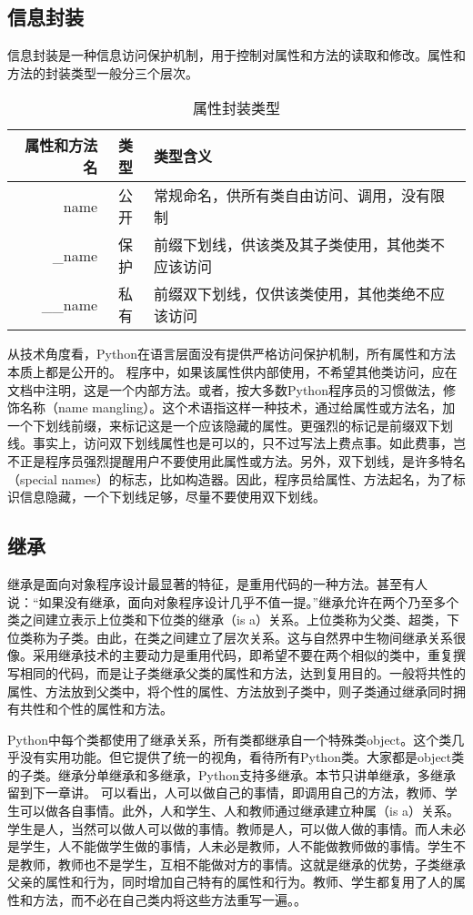 \subsection{信息封装}
信息封装是一种信息访问保护机制，用于控制对属性和方法的读取和修改。属性和方法的封装类型一般分三个层次。
\begin{table}
  \centering
  \begin{tabular}{rcl}
    \toprule
    属性和方法名 & 类型 & 类型含义 \\
    \midrule
    name        & 公开  & 常规命名，供所有类自由访问、调用，没有限制 \\
    \_name      & 保护  & 前缀下划线，供该类及其子类使用，其他类不应该访问 \\
    \_\_name    & 私有  & 前缀双下划线，仅供该类使用，其他类绝不应该访问 \\
    \bottomrule
  \end{tabular}
  \caption{属性封装类型}
\end{table}
从技术角度看，Python在语言层面没有提供严格访问保护机制，所有属性和方法本质上都是公开的。 程序中，如果该属性供内部使用，不希望其他类访问，应在文档中注明，这是一个内部方法。或者，按大多数Python程序员的习惯做法，修饰名称（name mangling）。这个术语指这样一种技术，通过给属性或方法名，加一个下划线前缀，来标记这是一个应该隐藏的属性。更强烈的标记是前缀双下划线。事实上，访问双下划线属性也是可以的，只不过写法上费点事。如此费事，岂不正是程序员强烈提醒用户不要使用此属性或方法。另外，双下划线，是许多特名（special names）的标志，比如构造器。因此，程序员给属性、方法起名，为了标识信息隐藏，一个下划线足够，尽量不要使用双下划线。

\subsection{继承}
继承是面向对象程序设计最显著的特征，是重用代码的一种方法。甚至有人说：“如果没有继承，面向对象程序设计几乎不值一提。”继承允许在两个乃至多个类之间建立表示上位类和下位类的继承（is a）关系。上位类称为父类、超类，下位类称为子类。由此，在类之间建立了层次关系。这与自然界中生物间继承关系很像。采用继承技术的主要动力是重用代码，即希望不要在两个相似的类中，重复撰写相同的代码，而是让子类继承父类的属性和方法，达到复用目的。一般将共性的属性、方法放到父类中，将个性的属性、方法放到子类中，则子类通过继承同时拥有共性和个性的属性和方法。

Python中每个类都使用了继承关系，所有类都继承自一个特殊类object。这个类几乎没有实用功能。但它提供了统一的视角，看待所有Python类。大家都是object类的子类。继承分单继承和多继承，Python支持多继承。本节只讲单继承，多继承留到下一章讲。
可以看出，人可以做自己的事情，即调用自己的方法，教师、学生可以做各自事情。此外，人和学生、人和教师通过继承建立种属（is a）关系。学生是人，当然可以做人可以做的事情。教师是人，可以做人做的事情。而人未必是学生，人不能做学生做的事情，人未必是教师，人不能做教师做的事情。学生不是教师，教师也不是学生，互相不能做对方的事情。这就是继承的优势，子类继承父亲的属性和行为，同时增加自己特有的属性和行为。教师、学生都复用了人的属性和方法，而不必在自己类内将这些方法重写一遍。。
